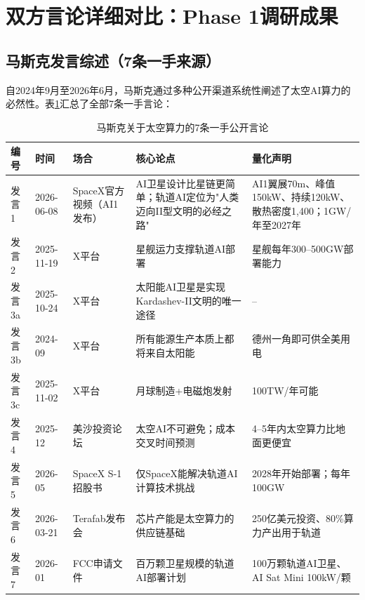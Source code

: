 
\section{双方言论详细对比：Phase 1调研成果}

\subsection{马斯克发言综述（7条一手来源）}

自2024年9月至2026年6月，马斯克通过多种公开渠道系统性阐述了太空AI算力的必然性。表\ref{tab:musk_statements}汇总了全部7条一手言论：

\begin{table}[H]
\centering
\caption{马斯克关于太空算力的7条一手公开言论}
\label{tab:musk_statements}
\small
\begin{tabular}{p{0.7cm}p{2.0cm}p{1.8cm}p{4.0cm}p{3.5cm}}
\toprule
\textbf{编号} & \textbf{时间} & \textbf{场合} & \textbf{核心论点} & \textbf{量化声明} \\
\midrule
发言1 & 2026-06-08 & SpaceX官方视频（AI1发布） & AI卫星设计比星链更简单；轨道AI定位为"人类迈向II型文明的必经之路" & AI1翼展70m、峰值150kW、持续120kW、散热密度1,400\unitWpm{}；1GW/年至2027年 \cite{spacex2026ai1} \\
\hline
发言2 & 2025-11-19 & X平台 & 星舰运力支撑轨道AI部署 & 星舰每年300--500GW部署能力 \cite{musk2025starship} \\
\hline
发言3a & 2025-10-24 & X平台 & 太阳能AI卫星是实现Kardashev-II文明的唯一途径 & -- \cite{musk2024kardashev} \\
\hline
发言3b & 2024-09 & X平台 & 所有能源生产本质上都将来自太阳能 & 德州一角即可供全美用电 \cite{musk2024kardashev} \\
\hline
发言3c & 2025-11-02 & X平台 & 月球制造+电磁炮发射 & 100TW/年可能 \cite{musk2025lunar} \\
\hline
发言4 & 2025-12 & 美沙投资论坛 & 太空AI不可避免；成本交叉时间预测 & 4--5年内太空算力比地面更便宜 \cite{musk2025us_saudi} \\
\hline
发言5 & 2026-05 & SpaceX S-1招股书 & 仅SpaceX能解决轨道AI计算技术挑战 & 2028年开始部署；每年100GW \cite{spacex2026s1} \\
\hline
发言6 & 2026-03-21 & Terafab发布会 & 芯片产能是太空算力的供应链基础 & 250亿美元投资、80\%算力产出用于轨道 \cite{musk2026terafab} \\
\hline
发言7 & 2026-01 & FCC申请文件 & 百万颗卫星规模的轨道AI部署计划 & 100万颗轨道AI卫星、AI Sat Mini 100kW/颗 \cite{spacex2026fcc} \\
\bottomrule
\end{tabular}
\end{table}

